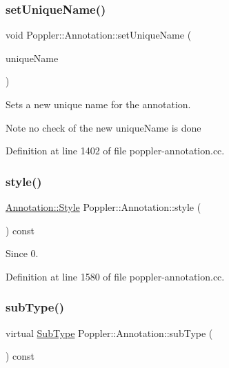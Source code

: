 \subsubsection{\texorpdfstring{set\+Unique\+Name()}{setUniqueName()}}
{\footnotesize\ttfamily void Poppler\+::\+Annotation\+::set\+Unique\+Name (\begin{DoxyParamCaption}\item[{const Q\+String \&}]{unique\+Name }\end{DoxyParamCaption})}

Sets a new unique name for the annotation.

\begin{DoxyNote}{Note}
no check of the new unique\+Name is done 
\end{DoxyNote}


Definition at line 1402 of file poppler-\/annotation.\+cc.

\mbox{\label{class_poppler_1_1_annotation_a4857ee8533e1430f5776507f465040a8}} 
\subsubsection{\texorpdfstring{style()}{style()}}
{\footnotesize\ttfamily \hyperlink{class_poppler_1_1_annotation_1_1_style}{Annotation\+::\+Style} Poppler\+::\+Annotation\+::style (\begin{DoxyParamCaption}{ }\end{DoxyParamCaption}) const}

\begin{DoxySince}{Since}
0. 
\end{DoxySince}


Definition at line 1580 of file poppler-\/annotation.\+cc.

\mbox{\label{class_poppler_1_1_annotation_aef7fa1532193b41fbeba6e577579d984}} 
\subsubsection{\texorpdfstring{sub\+Type()}{subType()}}
{\footnotesize\ttfamily virtual \hyperlink{class_poppler_1_1_annotation_a2d592999c330949d64679cfa9e81113f}{Sub\+Type} Poppler\+::\+Annotation\+::sub\+Type (\begin{DoxyParamCaption}{ }\end{DoxyParamCaption}) const\hspace{0.3cm}{\ttfamily [pure virtual]}}

